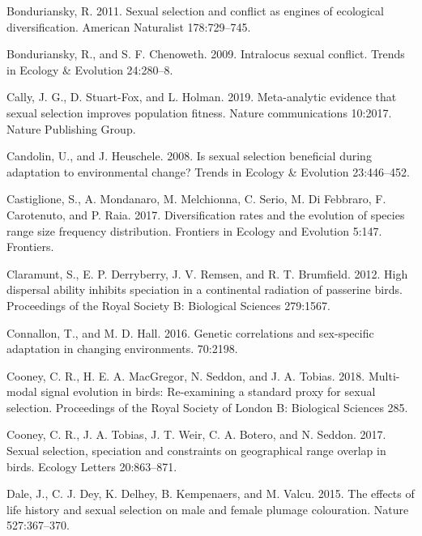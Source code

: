 \documentclass[]{article}
\begin{document}
\leavevmode\hypertarget{ref-Bonduriansky_2011}{}%
Bonduriansky, R. 2011. Sexual selection and conflict as engines of
ecological diversification. American Naturalist 178:729--745.

\leavevmode\hypertarget{ref-Bonduriansky_Chenoweth_2009}{}%
Bonduriansky, R., and S. F. Chenoweth. 2009. Intralocus sexual conflict.
Trends in Ecology \& Evolution 24:280--8.

\leavevmode\hypertarget{ref-Cally_2019}{}%
Cally, J. G., D. Stuart-Fox, and L. Holman. 2019. Meta-analytic evidence
that sexual selection improves population fitness. Nature communications
10:2017. Nature Publishing Group.

\leavevmode\hypertarget{ref-Candolin_2008}{}%
Candolin, U., and J. Heuschele. 2008. Is sexual selection beneficial
during adaptation to environmental change? Trends in Ecology \&
Evolution 23:446--452.

\leavevmode\hypertarget{ref-Castiglione_2017}{}%
Castiglione, S., A. Mondanaro, M. Melchionna, C. Serio, M. Di Febbraro,
F. Carotenuto, and P. Raia. 2017. Diversification rates and the
evolution of species range size frequency distribution. Frontiers in
Ecology and Evolution 5:147. Frontiers.

\leavevmode\hypertarget{ref-Claramunt_2012}{}%
Claramunt, S., E. P. Derryberry, J. V. Remsen, and R. T. Brumfield.
2012. High dispersal ability inhibits speciation in a continental
radiation of passerine birds. Proceedings of the Royal Society B:
Biological Sciences 279:1567.

\leavevmode\hypertarget{ref-Connallon_Hall_2016}{}%
Connallon, T., and M. D. Hall. 2016. Genetic correlations and
sex-specific adaptation in changing environments. 70:2198.

\leavevmode\hypertarget{ref-Cooney_2018}{}%
Cooney, C. R., H. E. A. MacGregor, N. Seddon, and J. A. Tobias. 2018.
Multi-modal signal evolution in birds: Re-examining a standard proxy for
sexual selection. Proceedings of the Royal Society of London B:
Biological Sciences 285.

\leavevmode\hypertarget{ref-Cooney_2017}{}%
Cooney, C. R., J. A. Tobias, J. T. Weir, C. A. Botero, and N. Seddon.
2017. Sexual selection, speciation and constraints on geographical range
overlap in birds. Ecology Letters 20:863--871.

\leavevmode\hypertarget{ref-Dale_2015}{}%
Dale, J., C. J. Dey, K. Delhey, B. Kempenaers, and M. Valcu. 2015. The
effects of life history and sexual selection on male and female plumage
colouration. Nature 527:367--370.
\end{document}
